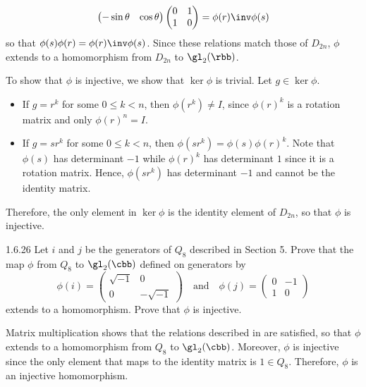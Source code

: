 \begin{solenum}
\[\begin{pmatrix}
            -\sin \theta & \cos \theta
        \end{pmatrix}
        \begin{pmatrix}
            0 & 1 \\
            1 & 0
        \end{pmatrix} = \phi(r)\inv \phi(s)
    \]
    so that $\phi(s)\phi(r) = \phi(r)\inv \phi(s)$.
	Since these relations match those of $D_{2n}$, $\phi$ extends to a homomorphism from $D_{2n}$ to $\gl_2(\rbb)$.
    \item To show that $\phi$ is injective, we show that $\ker\phi$ is trivial.
	Let $g \in \ker\phi$.
    \begin{itemize}
        \item If $g = r^k$ for some $0 \leq k < n$, then $\phi(r^k) \neq I$, since $\phi(r)^k$ is a rotation matrix and only $\phi(r)^n = I$.
        \item If $g = sr^k$ for some $0 \leq k < n$, then $\phi(sr^k) = \phi(s)\phi(r)^k$.
	Note that $\phi(s)$ has determinant $-1$ while $\phi(r)^k$ has determinant $1$ since it is a rotation matrix.
	Hence, $\phi(sr^k)$ has determinant $-1$ and cannot be the identity matrix.
    \end{itemize}
    Therefore, the only element in $\ker\phi$ is the identity element of $D_{2n}$, so that $\phi$ is injective.
\end{solenum}

\begin{exercise}{1.6.26}
    Let $i$ and $j$ be the generators of $Q_8$ described in Section 5.
	Prove that the map $\phi$ from $Q_8$ to $\gl_2(\cbb)$ defined on generators by
    \[
        \phi(i) = 
        \begin{pmatrix}
            \sqrt{-1} & 0 \\
            0 & -\sqrt{-1}
        \end{pmatrix}
        \quad \text{and} \quad
        \phi(j) = 
        \begin{pmatrix}
            0 & -1 \\
            1 & 0
        \end{pmatrix}
    \]
    extends to a homomorphism.
	Prove that $\phi$ is injective.
\end{exercise}

\begin{sol}
    Matrix multiplication shows that the relations described in  are satisfied, so that $\phi$ extends to a homomorphism from $Q_8$ to $\gl_2(\cbb)$.
	Moreover, $\phi$ is injective since the only element that maps to the identity matrix is $1 \in Q_8$.
	Therefore, $\phi$ is an injective homomorphism.
\end{sol}
